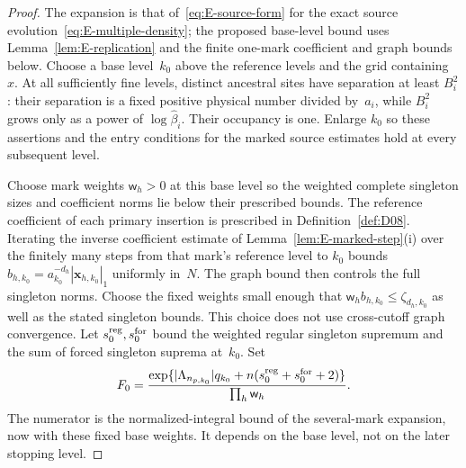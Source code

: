 \begin{proof}
The expansion is that of~\eqref{eq:E-source-form} for the exact source evolution~\eqref{eq:E-multiple-density}; the proposed base-level bound uses Lemma~\ref{lem:E-replication} and the finite one-mark coefficient and graph bounds below. Choose a base level~$k_0$ above the reference levels and the grid containing~$x$. At all sufficiently fine levels, distinct ancestral sites have separation at least $B_i^2$: their separation is a fixed positive physical number divided by~$a_i$, while $B_i^2$ grows only as a power of $\log\widehat\beta_i$. Their occupancy is one. Enlarge $k_0$ so these assertions and the entry conditions for the marked source estimates hold at every subsequent level.

Choose mark weights $\mathsf w_h>0$ at this base level so the weighted complete singleton sizes and coefficient norms lie below their prescribed bounds. The reference coefficient of each primary insertion is prescribed in Definition~\ref{def:D08}. Iterating the inverse coefficient estimate of Lemma~\ref{lem:E-marked-step}(i) over the finitely many steps from that mark's reference level to $k_0$ bounds $b_{h,k_0}=a_{k_0}^{-d_h}|\mathbf x_{h,k_0}|_1$ uniformly in~$N$. The graph bound then controls the full singleton norms. Choose the fixed weights small enough that $\mathsf w_hb_{h,k_0}\le\zeta_{d_h,k_0}$ as well as the stated singleton bounds. This choice does not use cross-cutoff graph convergence. Let $s_0^{\rm reg},s_0^{\rm for}$ bound the weighted regular singleton supremum and the sum of forced singleton suprema at~$k_0$. Set
\begin{equation}\label{eq:E-stopping-constant}
 F_0=\frac{\exp\{|\Lambda_{n_{p,k_0}}|q_{k_0}
                      +n(s_0^{\rm reg}+s_0^{\rm for}+2)\}}{\prod_h\mathsf w_h}.
\end{equation}
The numerator is the normalized-integral bound of the several-mark expansion, now with these fixed base weights. It depends on the base level, not on the later stopping level.


\end{proof}
